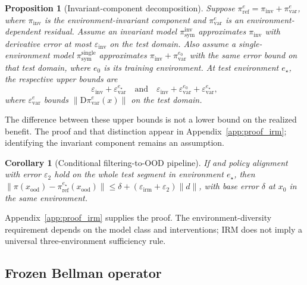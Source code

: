 \documentclass[10pt]{article}
\newtheorem{corollary}[theorem]{Corollary}
\newtheorem{proposition}[theorem]{Proposition}
\begin{document}
\begin{proposition}[Invariant-component decomposition]
\label{thm:irm_causal}
Suppose
$\pi_{\mathrm{ref}}^e=\pi_{\mathrm{inv}}+\pi_{\mathrm{var}}^e$,
where $\pi_{\mathrm{inv}}$ is the environment-invariant component and
$\pi_{\mathrm{var}}^e$ is an environment-dependent residual.
Assume an invariant model $\pi_{\mathrm{sym}}^{\mathrm{inv}}$ approximates $\pi_{\mathrm{inv}}$ with derivative error at most $\varepsilon_{\mathrm{inv}}$ on the test domain.
Also assume a single-environment model $\pi_{\mathrm{sym}}^{\mathrm{single}}$ approximates
$\pi_{\mathrm{inv}}+\pi_{\mathrm{var}}^{e_0}$ with the same error bound on that test domain, where $e_0$ is its training environment.
At test environment $e_\star$, the respective upper bounds are
\[
\varepsilon_{\mathrm{inv}}+\varepsilon_{\mathrm{var}}^{e_\star}
\quad\text{and}\quad
\varepsilon_{\mathrm{inv}}+
\varepsilon_{\mathrm{var}}^{e_0}+
\varepsilon_{\mathrm{var}}^{e_\star},
\]
where $\varepsilon_{\mathrm{var}}^e$ bounds
$\|\mathrm{D}\pi_{\mathrm{var}}^e(x)\|$ on the test domain.
\end{proposition}
The difference between these upper bounds is not a lower bound on the realized benefit. The proof and that distinction appear in Appendix~\ref{app:proof_irm}; identifying the invariant component remains an assumption.

\begin{corollary}[Conditional filtering-to-OOD pipeline]
\label{thm:irm_pipeline}
If  and policy alignment with error $\varepsilon_2$ hold on the whole test segment in environment $e_\star$, then
$\|\pi(x_{\mathrm{ood}})-\pi_{\mathrm{ref}}^{e_\star}(x_{\mathrm{ood}})\|
\leq\delta+(\varepsilon_{\mathrm{irm}}+\varepsilon_2)\|d\|$,
with base error $\delta$ at $x_0$ in the same environment.
\end{corollary}
Appendix~\ref{app:proof_irm} supplies the proof. The environment-diversity requirement depends on the model class and interventions; IRM does not imply a universal three-environment sufficiency rule.

\subsection{Frozen Bellman operator}
\label{sec:operator}
\end{document}
